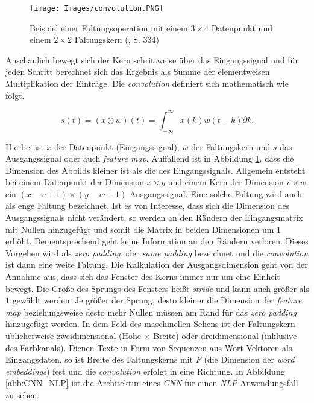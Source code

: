 \documentclass[a4paper,11pt]{article}
\begin{document}
\begin{figure}[!ht]
\begin{center}
\texttt{[image: Images/convolution.PNG]}
\caption{Beispiel einer Faltungsoperation mit einem $3 \times 4$ Datenpunkt und einem $2 \times 2$ Faltungskern (\cite{deepL}, S. 334)}
\label{abb:convolution}
\end{center}
\end{figure}

Anschaulich bewegt sich der Kern schrittweise über das Eingangssignal und für jeden Schritt berechnet sich das Ergebnis als Summe der elementweisen Multiplikation der Einträge. Die \textit{convolution} definiert sich mathematisch wie folgt.

\[s(t) = (x \odot w)(t) =  \int_{- \infty}^{\infty} x(k)w(t-k) \partial k  .\]

Hierbei ist $x$ der Datenpunkt (Eingangssignal), $w$ der Faltungskern und $s$ das Ausgangssignal oder auch \textit{feature map}. Auffallend ist in Abbildung \ref{abb:convolution}, dass die Dimension des Abbilds kleiner ist als die des Eingangssignals. Allgemein entsteht bei einem Datenpunkt der Dimension $x \times y$ und einem Kern der Dimension $v \times w$ ein $(x-v + 1) \times (y - w +1)$ Ausgangssignal. Eine solche Faltung wird auch als enge Faltung bezeichnet. Ist es von Interesse, dass sich die Dimension des Ausgangssignals nicht verändert, so werden an den Rändern der Eingangsmatrix mit Nullen hinzugefügt und somit die Matrix in beiden Dimensionen um $1$ erhöht. Dementsprechend geht keine Information an den Rändern verloren. Dieses Vorgehen wird als \textit{zero padding} oder \textit{same padding} bezeichnet und die \textit{convolution} ist dann eine weite Faltung. Die Kalkulation der Ausgangsdimension geht von der Annahme aus, dass sich das Fenster des Kerns immer nur um eine Einheit bewegt. Die Größe des Sprungs des Fensters heißt \textit{stride} und kann auch größer als $1$ gewählt werden. Je größer der Sprung, desto kleiner die Dimension der \textit{feature map} beziehungsweise desto mehr Nullen müssen am Rand für das \textit{zero padding} hinzugefügt werden. In dem Feld des maschinellen Sehens ist der Faltungskern üblicherweise zweidimensional (Höhe $\times$ Breite) oder dreidimensional (inklusive des Farbkanals). Dienen Texte in Form von Sequenzen aus Wort-Vektoren als Eingangsdaten, so ist Breite des Faltungskerns mit $F$ (die Dimension der \textit{word embeddings}) fest und die \textit{convolution} erfolgt in eine Richtung. In Abbildung \ref{abb:CNN_NLP} ist die Architektur eines \textit{CNN} für einen \textit{NLP} Anwendungsfall zu sehen.
\end{document}
